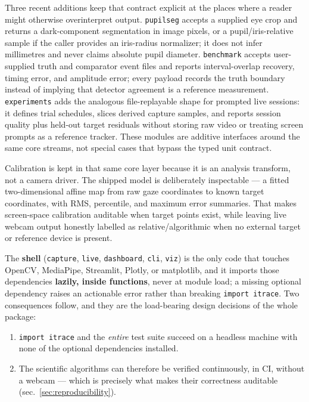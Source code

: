 \documentclass[
]{article}
\newcounter{none} %
\providecommand{\tightlist}{%
  \setlength{\itemsep}{0pt}\setlength{\parskip}{0pt}}
\begin{document}
Three recent additions keep that contract explicit at the places where a
reader might otherwise overinterpret output. \texttt{pupilseg} accepts a
supplied eye crop and returns a dark-component segmentation in image
pixels, or a pupil/iris-relative sample if the caller provides an
iris-radius normalizer; it does not infer millimetres and never claims
absolute pupil diameter. \texttt{benchmark} accepts user-supplied truth
and comparator event files and reports interval-overlap recovery, timing
error, and amplitude error; every payload records the truth boundary
instead of implying that detector agreement is a reference measurement.
\texttt{experiments} adds the analogous file-replayable shape for
prompted live sessions: it defines trial schedules, slices derived
capture samples, and reports session quality plus held-out target
residuals without storing raw video or treating screen prompts as a
reference tracker. These modules are additive interfaces around the same
core streams, not special cases that bypass the typed unit contract.

Calibration is kept in that same core layer because it is an analysis
transform, not a camera driver. The shipped model is deliberately
inspectable --- a fitted two-dimensional affine map from raw gaze
coordinates to known target coordinates, with RMS, percentile, and
maximum error summaries. That makes screen-space calibration auditable
when target points exist, while leaving live webcam output honestly
labelled as relative/algorithmic when no external target or reference
device is present.

The \textbf{shell} (\texttt{capture}, \texttt{live}, \texttt{dashboard},
\texttt{cli}, \texttt{viz}) is the only code that touches OpenCV,
MediaPipe, Streamlit, Plotly, or matplotlib, and it imports those
dependencies \textbf{lazily, inside functions}, never at module load; a
missing optional dependency raises an actionable error rather than
breaking \texttt{import\ itrace}. Two consequences follow, and they are
the load-bearing design decisions of the whole package:

\begin{enumerate}
\def\labelenumi{\arabic{enumi}.}
\tightlist
\item
  \texttt{import\ itrace} and the \emph{entire} test suite succeed on a
  headless machine with none of the optional dependencies installed.
\item
  The scientific algorithms can therefore be verified continuously, in
  CI, without a webcam --- which is precisely what makes their
  correctness auditable (sec.~\ref{sec:reproducibility}).
\end{enumerate}
\end{document}
